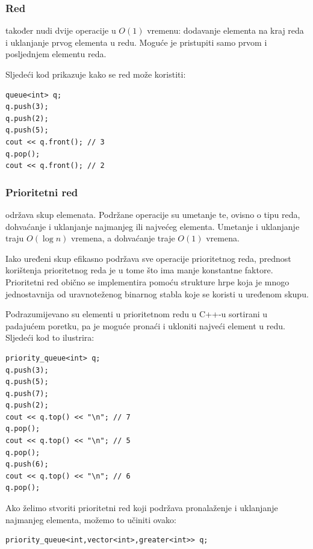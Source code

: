 \subsubsection{Red}


 također
nudi dvije operacije u $O(1)$ vremenu:
dodavanje elementa na kraj reda
i uklanjanje prvog elementa u redu.
Moguće je pristupiti samo prvom
i posljednjem elementu reda.

Sljedeći kod prikazuje kako se red može koristiti:
\begin{lstlisting}
queue<int> q;
q.push(3);
q.push(2);
q.push(5);
cout << q.front(); // 3
q.pop();
cout << q.front(); // 2
\end{lstlisting}

\subsubsection{Prioritetni red}


održava skup elemenata.
Podržane operacije su umetanje te,
ovisno o tipu reda,
dohvaćanje i uklanjanje
najmanjeg ili najvećeg elementa.
Umetanje i uklanjanje traju $O(\log n)$ vremena,
a dohvaćanje traje $O(1)$ vremena.

Iako uređeni skup efikasno podržava
sve operacije prioritetnog reda,
prednost korištenja prioritetnog reda je
u tome što ima manje konstantne faktore.
Prioritetni red obično se implementira pomoću
strukture hrpe koja je mnogo jednostavnija od
uravnoteženog binarnog stabla koje se koristi u uređenom skupu.

\begin{samepage}
Podrazumijevano su elementi u prioritetnom
redu u C++-u sortirani u padajućem poretku,
pa je moguće pronaći i ukloniti
najveći element u redu.
Sljedeći kod to ilustrira:

\begin{lstlisting}
priority_queue<int> q;
q.push(3);
q.push(5);
q.push(7);
q.push(2);
cout << q.top() << "\n"; // 7
q.pop();
cout << q.top() << "\n"; // 5
q.pop();
q.push(6);
cout << q.top() << "\n"; // 6
q.pop();
\end{lstlisting}
\end{samepage}

Ako želimo stvoriti prioritetni red
koji podržava pronalaženje i uklanjanje
najmanjeg elementa,
možemo to učiniti ovako:

\begin{lstlisting}
priority_queue<int,vector<int>,greater<int>> q;
\end{lstlisting}

